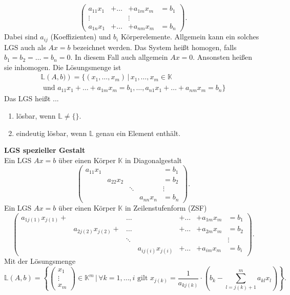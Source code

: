 \documentclass[a4paper,12pt]{article}
\numberwithin{equation}{section}
\begin{document}
\[ 
        \left(\begin{matrix}
                        a_{11}x_1&+\hdots&+a_{1m}x_m&=b_1\\
                        \vdots&&\vdots\\
                        a_{1n}x_1&+\hdots&+a_{nm}x_m&=b_n
        \end{matrix}\right)
.\] 
Dabei sind $a_{ij}$ (Koeffizienten) und $b_i$ Körperelemente. Allgemein kann ein solches LGS auch als $Ax=b$ bezeichnet werden. Das System heißt homogen, falls $b_1=b_2=\hdots=b_n=0$. In diesem Fall auch allgemein $Ax=0$. Ansonsten heißen sie inhomogen. Die Lösungsmenge ist
\begin{gather*}
        \mathbb{L}\left(A,b)\right)=\{\left(x_1,\hdots,x_m\right)\,|\, x_1,\hdots,x_m \in \mathbb{K}\\\text{ und }a_{11}x_1+\hdots+a_{1m}x_m=b_1,\hdots,a_{n1}x_1+\hdots+a_{nm}x_m=b_n\}
\end{gather*}
Das LGS heißt ...
\begin{enumerate}[label=...]
        \item lösbar, wenn $\mathbb{L}\neq \{\}$.
        \item eindeutig lösbar, wenn $\mathbb{L}$ genau ein Element enthält.
\end{enumerate}
\textbf{LGS spezieller Gestalt}\\
Ein LGS $Ax=b$ über einen Körper $\mathbb{K}$ in Diagonalgestalt
\[ 
        \left(\begin{matrix}
                        a_{11}x_1&&&&=b_1\\
                                 &a_{22}x_2&&&=b_2\\
                                 &&\ddots&&\vdots\\
                                 &&&a_{nn}x_n&=b_n
        \end{matrix}\right)
.\] 
Ein LGS $Ax=b$ über einen Körper $\mathbb{K}$ in Zeilenstufenform (ZSF)
\[ 
        \left(\begin{matrix}
                        a_{1j\left(1\right)}x_{j\left(1\right)}+&&\hdots&&+\hdots&+a_{1m}x_m&=b_1\\
                                                               &a_{2j\left(2\right)}x_{j\left(2\right)}+&\hdots&&+\hdots&+a_{2m}x_m&=b_2\\
                                                               &&\ddots&&&&\vdots\\
                                                               &&&a_{ij\left(i\right)}x_{j\left(i\right)}&+\hdots&+a_{im}x_m&=b_i
        \end{matrix}\right)
.\] 
Mit der Lösungsmenge
\[ 
        \mathbb{L}\left(A,b\right)=\left\{\left(\begin{matrix}
                x_1\\\vdots\\x_m
\end{matrix}\right) \in \mathbb{K}^m\,|\, \forall k=1,\hdots,i\text{ gilt }x_{j\left(k\right)}=\dfrac{1}{a_{kj\left(k\right)}}\cdot \left(b_k-\sum_{l=j\left(k\right)+1}^{m}a_{kl}x_l\right)\right\}
.\] 
\end{document}
